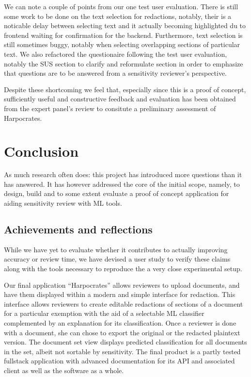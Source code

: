 \documentclass[\version]{l4proj}
\begin{document}
We can note a couple of points from our one test user evaluation.
There is still some work to be done on the text selection for redactions, notably, their is a noticable delay between selecting text and it actually becoming highlighted du to frontend waiting for confirmation for the backend.
Furthermore, text selection is still sometimes buggy, notably when selecting overlapping sections of particular text.
We also refactored the questionaire following the test user evaluation, notably the SUS section to clarify and reformulate section in order to emphasize that questions are to be answered from a sensitivity reviewer's perspective.

Despite these shortcoming we feel that, especially since this is a proof of concept, sufficiently useful and constructive feedback and evaluation has been obtained from the expert panel's review to consitute a preliminary assessment of Harpocrates.


\chapter{Conclusion}

As much research often does: this project has introduced more questions than it has answered.
It has however addressed the core of the initial scope, namely, to design, build and to some extent evaluate a proof of concept application for aiding sensitivity review with ML tools.

\section{Achievements and reflections}

While we have yet to evaluate whether it contributes to actually improving accuracy or review time, we have devised a user study to verify these claims along with the tools necessary to reproduce the a very close experimental setup.

Our final application ``Harpocrates'' allows reviewers to upload documents, and have them displayed within a modern and simple interface for redaction.
This interface allows reviewers to create editable redactions of sections of a document for a particular exemption with the aid of a selectable ML classifier complemented by an explanation for its classification.
Once a reviewer is done with a document, she can chose to export the original or the redacted plaintext version.
The document set view displays predicted classification for all documents in the set, albeit not sortable by sensitivity.
The final product is a partly tested fullstack application with advanced documentation for its API and associated client as well as the software as a whole.
\end{document}
